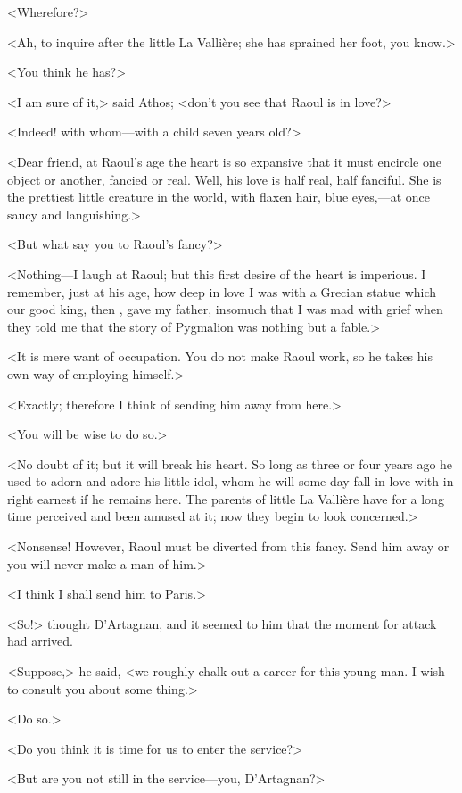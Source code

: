 <Wherefore?>

<Ah, to inquire after the little La Vallière; she has sprained her foot, you know.>

<You think he has?>

<I am sure of it,> said Athos; <don't you see that Raoul is in love?>

<Indeed! with whom—with a child seven years old?>

<Dear friend, at Raoul's age the heart is so expansive that it must encircle one object or another, fancied or real. Well, his love is half real, half fanciful. She is the prettiest little creature in the world, with flaxen hair, blue eyes,—at once saucy and languishing.>

<But what say you to Raoul's fancy?>

<Nothing—I laugh at Raoul; but this first desire of the heart is imperious. I remember, just at his age, how deep in love I was with a Grecian statue which our good king, then , gave my father, insomuch that I was mad with grief when they told me that the story of Pygmalion was nothing but a fable.>

<It is mere want of occupation. You do not make Raoul work, so he takes his own way of employing himself.>

<Exactly; therefore I think of sending him away from here.>

<You will be wise to do so.>

<No doubt of it; but it will break his heart. So long as three or four years ago he used to adorn and adore his little idol, whom he will some day fall in love with in right earnest if he remains here. The parents of little La Vallière have for a long time perceived and been amused at it; now they begin to look concerned.>

<Nonsense! However, Raoul must be diverted from this fancy. Send him away or you will never make a man of him.>

<I think I shall send him to Paris.>

<So!> thought D'Artagnan, and it seemed to him that the moment for attack had arrived.

<Suppose,> he said, <we roughly chalk out a career for this young man. I wish to consult you about some thing.>

<Do so.>

<Do you think it is time for us to enter the service?>

<But are you not still in the service—you, D'Artagnan?>

